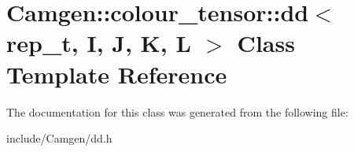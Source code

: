 \hypertarget{a00117}{}\section{Camgen\+:\+:colour\+\_\+tensor\+:\+:dd$<$ rep\+\_\+t, I, J, K, L $>$ Class Template Reference}
\label{a00117}


The documentation for this class was generated from the following file\+:\begin{DoxyCompactItemize}
\item 
include/\+Camgen/dd.\+h\end{DoxyCompactItemize}

